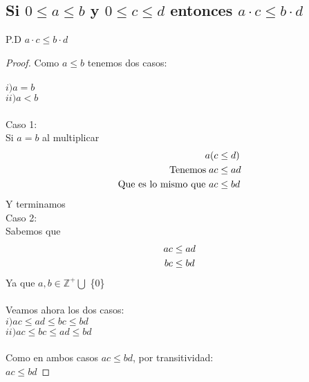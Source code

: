\documentclass[12pt]{article}
\begin{document}
	    \subsection{ Si $0 \leq a \leq b $ y $0 \leq c \leq d$ entonces $a \cdot c \leq b \cdot d$}
    	    P.D $a \cdot c \leq b \cdot d$ \\
    	    \begin{proof}
        	    Como $a \leq b$ tenemos dos casos: \\ \\
        	    $i) a = b$ \\
        	    $ii) a < b$ \\ \\
    	        Caso 1: \\
    	        Si $a=b$ al multiplicar
    	        \begin{align}
    	            \notag a(c &\leq d) \\
     	            \notag \text{Tenemos} \; ac &\leq ad \\
     	            \notag \text{Que es lo mismo que } ac &\leq bd
    	        \end{align}
    	        Y terminamos \\
    	        Caso 2: \\
    	        Sabemos que \\
    	        \begin{align}
    	            \notag ac &\leq ad \\
    	            \notag bc &\leq bd
    	        \end{align}
    	        Ya que $a,b \in \mathbb{Z^+} \bigcup$ \{$0$\} \\ \\
    	        Veamos ahora los dos casos: \\
    	        $i) ac \leq ad \leq bc \leq bd$ \\
    	        $ii) ac \leq bc \leq ad \leq bd$ \\ \\
    	        Como en ambos casos $ac \leq bd$, por transitividad: \\
    	        $ac \leq bd$
    	    \end{proof}
	        \blacksquare
\end{document}
